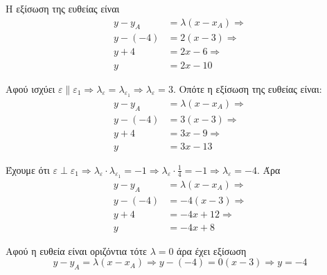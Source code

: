 \begin{alist}
\item Η εξίσωση της ευθείας είναι
\begin{align*}
y-y_A&=\lambda(x-x_A)\Rightarrow\\
y-(-4)&=2(x-3)\Rightarrow\\
y+4&=2x-6\Rightarrow\\
y&=2x-10
\end{align*}
\item Αφού ισχύει $ \varepsilon\parallel\varepsilon_1\Rightarrow \lambda_{\varepsilon}=\lambda_{\varepsilon_1}\Rightarrow \lambda_{\varepsilon}=3 $. Οπότε η εξίσωση της ευθείας είναι:
\begin{align*}
y-y_A&=\lambda(x-x_A)\Rightarrow\\
y-(-4)&=3(x-3)\Rightarrow\\
y+4&=3x-9\Rightarrow\\
y&=3x-13
\end{align*}
\item Έχουμε ότι $ \varepsilon\perp\varepsilon_1\Rightarrow \lambda_{\varepsilon}\cdot\lambda_{\varepsilon_1}=-1\Rightarrow\lambda_{\varepsilon}\cdot\frac{1}{4}=-1\Rightarrow \lambda_{\varepsilon}=-4 $. Άρα
\begin{align*}
y-y_A&=\lambda(x-x_A)\Rightarrow\\
y-(-4)&=-4(x-3)\Rightarrow\\
y+4&=-4x+12\Rightarrow\\
y&=-4x+8
\end{align*}
\item Αφού η ευθεία είναι οριζόντια τότε $ \lambda=0 $ άρα έχει εξίσωση
\[ y-y_A=\lambda(x-x_A)\Rightarrow y-(-4)=0(x-3)\Rightarrow y=-4 \]
\end{alist}
